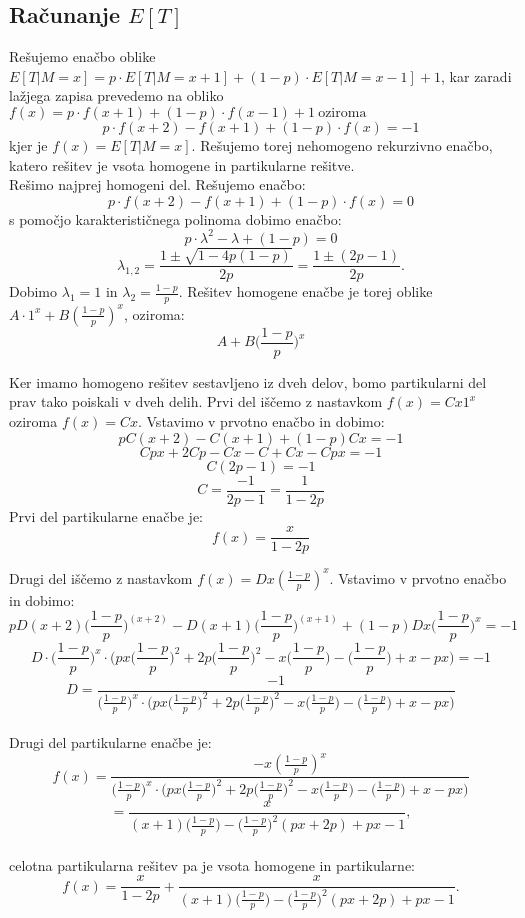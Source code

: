 \documentclass[12pt, a4paper]{article}
\begin{document}
\subsection{Računanje $E[T]$}

Rešujemo enačbo oblike $E[T|M=x] = p\cdot E[T|M=x+1] + (1-p)\cdot E[T|M=x-1] + 1$, kar zaradi lažjega zapisa prevedemo na obliko $f(x) = p\cdot f(x+1) + (1-p) \cdot f(x-1) + 1 ~ \textrm{oziroma} $ $$p\cdot f(x+2) - f(x+1) + (1-p)\cdot f(x) = -1$$ kjer je $f(x)=E[T|M=x]$. Rešujemo torej nehomogeno rekurzivno enačbo, katero rešitev je vsota homogene in partikularne rešitve. 
\\
Rešimo najprej homogeni del. Rešujemo enačbo: $$p\cdot f(x+2) - f(x+1) + (1-p)\cdot f(x) = 0$$ s pomočjo karakterističnega polinoma dobimo enačbo: $$p\cdot  \lambda ^2 - \lambda + (1-p) = 0$$ $$\lambda _{1, 2}= \frac{1 \pm \sqrt{1 - 4p(1-p)}}{2p} = \frac{1 \pm (2p-1)}{2p}.$$
Dobimo $\lambda _{1} = 1$ in $\lambda _{2} = \frac{1-p}{p}$. Rešitev homogene enačbe je torej oblike $A\cdot 1^x + B(\frac{1-p}{p})^x$, oziroma: $$A+ B \bigg( \frac{1-p}{p} \bigg )^x$$

Ker imamo homogeno rešitev sestavljeno iz dveh delov, bomo partikularni del prav tako poiskali v dveh delih. Prvi del iščemo z nastavkom $f(x)= Cx1^x$ oziroma $f(x)= Cx$. Vstavimo v prvotno enačbo in dobimo: $$pC(x+2)-C(x+1)+(1-p)Cx=-1$$ $$Cpx+2Cp-Cx-C+Cx-Cpx=-1$$ $$C(2p-1)=-1$$ $$C=\frac{-1}{2p-1} = \frac{1}{1-2p}$$ Prvi del partikularne enačbe je: $$f(x)=\frac{x}{1-2p}$$

Drugi del iščemo z nastavkom $f(x) = D x (\frac{1-p}{p})^x$. Vstavimo v prvotno enačbo in dobimo:
$$pD(x+2)\bigg( \frac{1-p}{p} \bigg )^{(x+2)} - D(x+1)\bigg( \frac{1-p}{p} \bigg )^{(x+1 )}+(1-p)Dx\bigg( \frac{1-p}{p} \bigg )^x = -1$$ 
$$D \cdot \bigg( \frac{1-p}{p} \bigg )^x \cdot \bigg( px\bigg( \frac{1-p}{p} \bigg )^2 + 2p\bigg( \frac{1-p}{p} \bigg )^2 -x\bigg( \frac{1-p}{p} \bigg )-\bigg( \frac{1-p}{p} \bigg )+x-px \bigg )= -1$$ 
$$D = \frac{-1}{\big( \frac{1-p}{p} \big )^x \cdot \big( px\big( \frac{1-p}{p} \big )^2 + 2p\big( \frac{1-p}{p} \big )^2 -x\big( \frac{1-p}{p} \big )-\big( \frac{1-p}{p} \big )+x-px \big )}$$ 
\\
Drugi del partikularne enačbe je: $$f(x) = \frac{-x  (\frac{1-p}{p})^x}{\big( \frac{1-p}{p} \big )^x \cdot \big( px\big( \frac{1-p}{p} \big )^2 + 2p\big( \frac{1-p}{p} \big )^2 -x\big( \frac{1-p}{p} \big )-\big( \frac{1-p}{p} \big )+x-px \big )}$$ $$= \frac{x}{(x+1)\big( \frac{1-p}{p} \big )-\big( \frac{1-p}{p} \big )^2(px+2p)+px-1},$$\\
celotna partikularna rešitev pa je vsota homogene in partikularne: $$f(x)=\frac{x}{1-2p}+\frac{x}{(x+1)\big( \frac{1-p}{p} \big )-\big( \frac{1-p}{p} \big )^2(px+2p)+px-1}.$$\\
\end{document}
